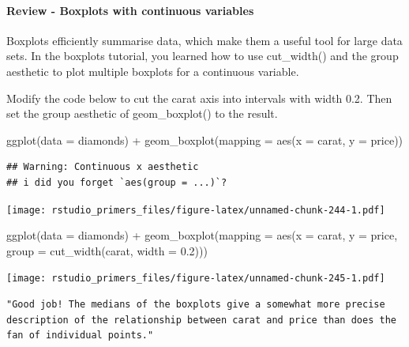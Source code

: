 \documentclass[
]{article}
\newenvironment{Shaded}{\begin{snugshade}}{\end{snugshade}}
\newcommand{\AttributeTok}[1]{\textcolor[rgb]{0.77,0.63,0.00}{#1}}
\newcommand{\FloatTok}[1]{\textcolor[rgb]{0.00,0.00,0.81}{#1}}
\newcommand{\FunctionTok}[1]{\textcolor[rgb]{0.00,0.00,0.00}{#1}}
\newcommand{\NormalTok}[1]{#1}
\newcommand{\SpecialCharTok}[1]{\textcolor[rgb]{0.00,0.00,0.00}{#1}}
\begin{document}
\hypertarget{review---boxplots-with-continuous-variables}{%
\paragraph{Review - Boxplots with continuous
variables}\label{review---boxplots-with-continuous-variables}}

Boxplots efficiently summarise data, which make them a useful tool for
large data sets. In the boxplots tutorial, you learned how to use
cut\_width() and the group aesthetic to plot multiple boxplots for a
continuous variable.

Modify the code below to cut the carat axis into intervals with width
0.2. Then set the group aesthetic of geom\_boxplot() to the result.

\begin{Shaded}
\begin{Highlighting}[]
\FunctionTok{ggplot}\NormalTok{(}\AttributeTok{data =}\NormalTok{ diamonds) }\SpecialCharTok{+}
  \FunctionTok{geom\_boxplot}\NormalTok{(}\AttributeTok{mapping =} \FunctionTok{aes}\NormalTok{(}\AttributeTok{x =}\NormalTok{ carat, }\AttributeTok{y =}\NormalTok{ price))}
\end{Highlighting}
\end{Shaded}

\begin{verbatim}
## Warning: Continuous x aesthetic
## i did you forget `aes(group = ...)`?
\end{verbatim}

\texttt{[image: rstudio\_primers\_files/figure-latex/unnamed-chunk-244-1.pdf]}

\begin{Shaded}
\begin{Highlighting}[]
\FunctionTok{ggplot}\NormalTok{(}\AttributeTok{data =}\NormalTok{ diamonds) }\SpecialCharTok{+}
  \FunctionTok{geom\_boxplot}\NormalTok{(}\AttributeTok{mapping =} \FunctionTok{aes}\NormalTok{(}\AttributeTok{x =}\NormalTok{ carat, }\AttributeTok{y =}\NormalTok{ price, }\AttributeTok{group =} \FunctionTok{cut\_width}\NormalTok{(carat, }\AttributeTok{width =} \FloatTok{0.2}\NormalTok{)))}
\end{Highlighting}
\end{Shaded}

\texttt{[image: rstudio\_primers\_files/figure-latex/unnamed-chunk-245-1.pdf]}

\begin{verbatim}
"Good job! The medians of the boxplots give a somewhat more precise description of the relationship between carat and price than does the fan of individual points."
\end{verbatim}
\end{document}
